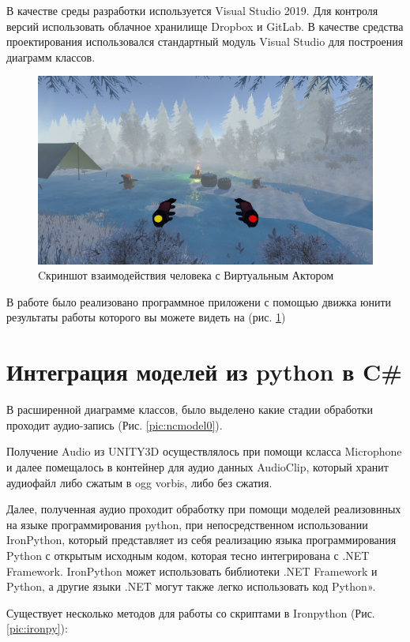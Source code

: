 В качестве среды разработки используется Visual Studio 2019. Для контроля версий использовать облачное хранилище Dropbox и GitLab. 
В качестве средства проектирования использовался стандартный модуль Visual Studio для построения диаграмм классов.

\begin{figure}[h]
\includegraphics[width=0.75\columnwidth]{./img/penis.png}
\centering
\caption{Cкриншот взаимодействия человека с Виртуальным Актором}
\label{pic:penis}
\end{figure}

В работе было реализовано программное приложени с помощью движка юнити результаты работы которого вы можете видеть на (рис. \ref{pic:penis})

\section{Интеграция моделей из python в C\#}

В расширенной диаграмме классов, было выделено 
какие стадии обработки проходит аудио-запись (Рис. \ref{pic:ncmodel0}).

Получение Audio из UNITY3D осуществлялось при помощи ксласса Microphone и далее помещалось 
в контейнер для аудио данных AudioClip, который хранит аудиофайл либо сжатым в ogg vorbis, либо без сжатия.

Далее, полученная аудио проходит обработку при помощи моделей реализовнных на языке программирования python, 
при непосредственном использовании IronPython, который представляет из себя реализацию языка программирования 
Python с открытым исходным кодом, которая тесно интегрирована с .NET Framework. 
IronPython может использовать библиотеки .NET Framework и Python, а другие языки .NET могут также легко использовать код Python».

Существует несколько методов для работы со скриптами в Ironpython (Рис. \ref{pic:ironpy}):

